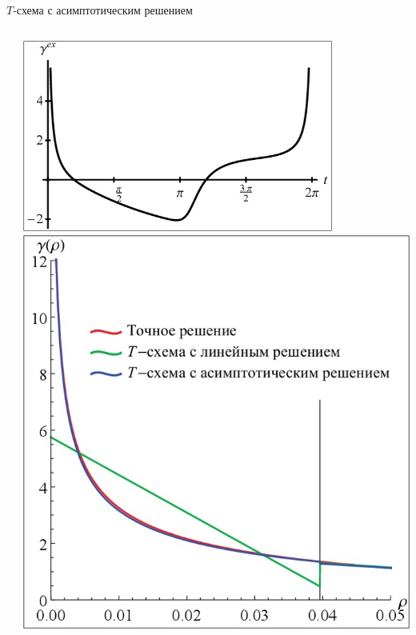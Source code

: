 \documentclass[ignoreonframetext,unicode]{beamer}
\begin{document}
\begin{frame}{$T$-схема с асимптотическим решением}
\begin{columns}
\begin{columns}
		\end{columns}
		\includegraphics[width=0.8\textwidth]{ris8}
		\includegraphics[height=\textwidth]{ris9}
	\end{columns}
\end{frame}
\end{document}
